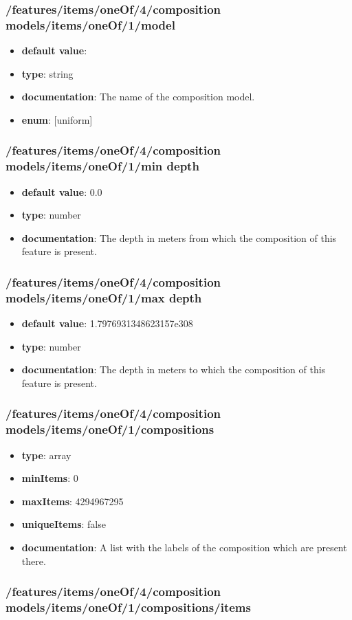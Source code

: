 \subsubsection{/features/items/oneOf/4/composition models/items/oneOf/1/model}
\begin{itemize}\item {\bf default value}: 
\item {\bf type}: string
\item {\bf documentation}: The name of the composition model.
\item {\bf enum}: [uniform]\end{itemize}\subsubsection{/features/items/oneOf/4/composition models/items/oneOf/1/min depth}
\begin{itemize}\item {\bf default value}: 0.0
\item {\bf type}: number
\item {\bf documentation}: The depth in meters from which the composition of this feature is present.
\end{itemize}\subsubsection{/features/items/oneOf/4/composition models/items/oneOf/1/max depth}
\begin{itemize}\item {\bf default value}: 1.7976931348623157e308
\item {\bf type}: number
\item {\bf documentation}: The depth in meters to which the composition of this feature is present.
\end{itemize}\subsubsection{/features/items/oneOf/4/composition models/items/oneOf/1/compositions}
\begin{itemize}\item {\bf type}: array
\item {\bf minItems}: 0
\item {\bf maxItems}: 4294967295
\item {\bf uniqueItems}: false
\item {\bf documentation}: A list with the labels of the composition which are present there.
\end{itemize}\subsubsection{/features/items/oneOf/4/composition models/items/oneOf/1/compositions/items}

